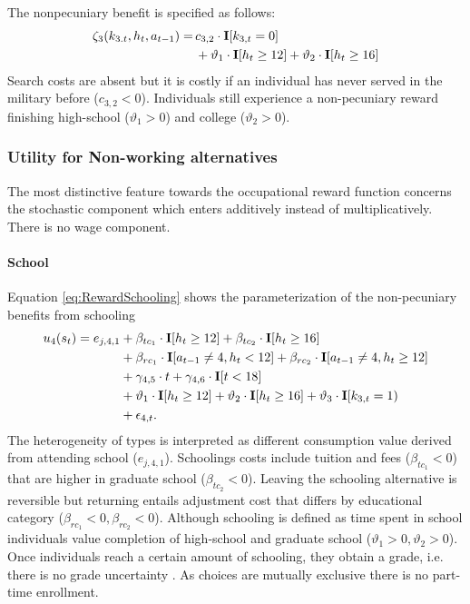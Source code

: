 \noindent The nonpecuniary benefit is specified as follows:  
%
\begin{align*}
\zeta_{3}( k_{3.t}, h_t, a_{t-1} )  = \,& c_{3,2} \cdot {\textbf{I}}[k_{3,t} = 0] \nonumber \\
  & + \vartheta_1 \cdot {\textbf{I}}[h_t \geq 12] + \vartheta_2 \cdot {\textbf{I}}[h_t \geq 16]
\end{align*}
Search costs are absent but it is costly if an individual has never served in the military before ($c_{3,2} < 0$). Individuals still experience a non-pecuniary reward finishing high-school ($\vartheta_1 >0$) and college ($\vartheta_2 > 0$).
\FloatBarrier\subsubsection*{Utility for Non-working alternatives}
The most distinctive feature towards the occupational reward function concerns the stochastic component which enters additively instead of multiplicatively. There is no wage component.
\FloatBarrier\paragraph*{School}
Equation \ref{eq:RewardSchooling} shows the parameterization of the non-pecuniary benefits from schooling
%
\begin{align}\label{eq:RewardSchooling}
	u_{4}(s_t) = e_{j, 4, 1} & + \beta_{tc_1} \cdot {\textbf{I}}[h_t \geq 12] + \beta_{tc_2} \cdot {\textbf{I}}[h_t \geq 16] 														\nonumber \\
    							  & + \beta_{rc_1} \cdot {\textbf{I}}[a_{t-1} \neq 4, h_t < 12] + \beta_{rc_2} \cdot {\textbf{I}}[a_{t-1} \neq 4, h_t \geq 12] 			   \nonumber \\
    							  & + \gamma_{4,5} \cdot t + \gamma_{4,6} \cdot {\textbf{I}}[t < 18] 																					  \nonumber \\
     							  & + \vartheta_1 \cdot {\textbf{I}}[h_t \geq 12] + \vartheta_2 \cdot {\textbf{I}}[h_t \geq 16] + \vartheta_3 \cdot {\textbf{I}}[k_{3,t} = 1) \nonumber \\
      							  & + \epsilon_{4,t}.
\end{align}
%
The heterogeneity of types is interpreted as different consumption value derived from attending school ($e_{j,4,1}$). Schoolings costs include tuition and fees ($\beta_{tc_1} < 0$) that are higher in graduate school ($\beta_{tc_2} < 0$). Leaving the schooling alternative is reversible but returning entails adjustment cost that differs by educational category ($\beta_{rc_1} <0, \beta_{rc_2} < 0$). Although schooling is defined as time spent in school individuals value completion of high-school and graduate school ($\vartheta_1 > 0, \vartheta_2 > 0$). Once individuals reach a certain amount of schooling, they obtain a grade, i.e. there is no grade uncertainty \citep{Altonji.1993}. As choices are mutually exclusive there is no part-time enrollment.
